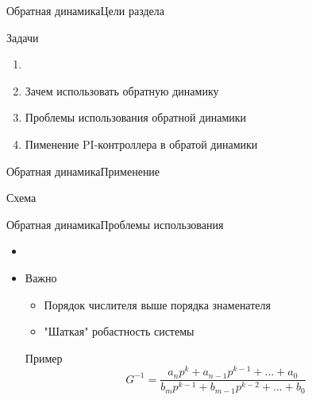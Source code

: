 \begin{frame}{Обратная динамика}{Цели раздела}
    \begin{block}{Задачи}
        \begin{enumerate}
            \item <+-> []
            \item <+-> Зачем использовать обратную динамику 
            \item <+-> Проблемы использования обратной динамики
            \item <+-> Пименение PI-контроллера в обратой динамики
        \end{enumerate}
    \end{block}
\end{frame}

\begin{frame}{Обратная динамика}{Применение}
    \begin{block}{Схема}
    \end{block}
\end{frame}

\begin{frame}{Обратная динамика}{Проблемы использования}
    \begin{itemize}
        \item <+-> []
        \item <+-> [] \begin{block}{Важно}
            \begin{itemize}
                \item Порядок числителя выше порядка знаменателя 
                \item "Шаткая" робастность системы
            \end{itemize}
        \end{block}
        \begin{exampleblock}{Пример}
            $$G^{-1} = \frac{a_n p^k + a_{n-1} p^{k-1} + ... + a_0}{b_m p^{k-1} + b_{m-1} p^{k-2} + ... + b_0}$$
        \end{exampleblock}
    \end{itemize}
\end{frame}

